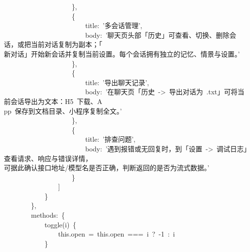 \documentclass[a4paper,10pt]{article}
\begin{document}
{~~~~~~~~~~~~~~~~~~~~\},\\
~~~~~~~~~~~~~~~~~~~~\{\\
~~~~~~~~~~~~~~~~~~~~~~~~title:~'多会话管理',\\
~~~~~~~~~~~~~~~~~~~~~~~~body:~'聊天页头部「历史」可查看、切换、删除会话，或把当前对话复制为副本；「\\
新对话」开始新会话并复制当前设置。每个会话拥有独立的记忆、情景与设置。'\\
~~~~~~~~~~~~~~~~~~~~\},\\
~~~~~~~~~~~~~~~~~~~~\{\\
~~~~~~~~~~~~~~~~~~~~~~~~title:~'导出聊天记录',\\
~~~~~~~~~~~~~~~~~~~~~~~~body:~'在聊天页「历史~->~导出对话为~.txt」可将当前会话导出为文本：H5~下载、A\\
pp~保存到文档目录、小程序复制全文。'\\
~~~~~~~~~~~~~~~~~~~~\},\\
~~~~~~~~~~~~~~~~~~~~\{\\
~~~~~~~~~~~~~~~~~~~~~~~~title:~'排查问题',\\
~~~~~~~~~~~~~~~~~~~~~~~~body:~'遇到报错或无回复时，到「设置~->~调试日志」查看请求、响应与错误详情，\\
可据此确认接口地址/模型名是否正确，判断返回的是否为流式数据。'\\
~~~~~~~~~~~~~~~~~~~~\}\\
~~~~~~~~~~~~~~~~]\\
~~~~~~~~~~~~\}\\
~~~~~~~~\},\\
~~~~~~~~methods:~\{\\
~~~~~~~~~~~~toggle(i)~\{\\
~~~~~~~~~~~~~~~~this.open~=~this.open~===~i~?~-1~:~i\\
~~~~~~~~~~~~\}
}

\newpage
\end{document}

